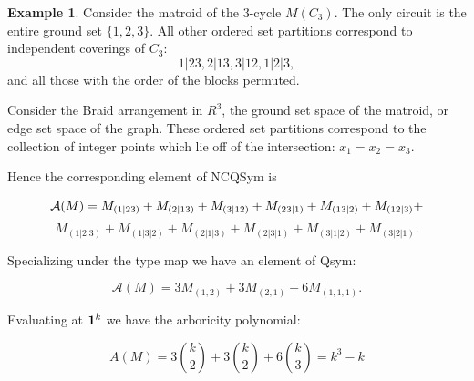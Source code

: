 \documentclass[12pt,reqno]{amsart}
\numberwithin{definition}{section}
\theoremstyle{definition}
\newtheorem{example}[definition]{Example}
\begin{document}
\begin{example}

Consider the matroid of the $3$-cycle $M(C_3)$.  The only circuit is the entire ground set $\{1,2,3\}$.  All other ordered set partitions correspond to independent coverings of $C_3$: 
$$1|23, 2|13, 3|12, 1|2|3,$$
and all those with the order of the blocks permuted. 

Consider the Braid arrangement in $R^3$, the ground set space of the
matroid, or edge set space of the graph.  These ordered set partitions
correspond to the collection of integer points which lie off of the
intersection: $x_1 = x_2 = x_3$.


 Hence the corresponding element of NCQSym is 

$${\bf{{\mathcal A}}}(M) = M_{(1|23)} + M_{(2|13)} + M_{(3|12)} + M_{(23|1)} + M_{(13|2)} +  M_{(12|3)} + $$ $$ M_{(1|2|3)} + M_{(1|3|2)}
+ M_{(2|1|3)} + M_{(2|3|1)} + M_{(3|1|2)} + M_{(3|2|1)}. $$

\noindent Specializing under the type map we have an element of Qsym:

$${\mathcal A}(M) = 3 M_{(1,2)} + 3 M_{(2,1)} + 6 M_{(1,1,1)}. $$

\noindent Evaluating at ${\bf 1}^k $ we have the arboricity polynomial:

$$ A(M) = 3 { k \choose 2} + 3 { k \choose 2} + 6 { k \choose 3} = k^3 - k $$

\end{example}



 

 
\end{document}
